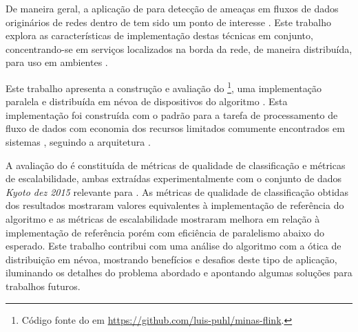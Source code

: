 De maneira geral, a aplicação de \nd para detecção de ameaças em fluxos de dados
originários de redes \iot dentro de \nids tem sido um ponto de interesse
\cite{Viegas2019,Lopez2019,DaCosta2019a}.
Este trabalho explora as características de implementação destas técnicas
em conjunto, concentrando-se em serviços localizados na borda da rede, de maneira
distribuída, para uso em ambientes \iot.



Este trabalho apresenta a construção e avaliação do \mfog\footnote{
    Código fonte do \mfog em \url{https://github.com/luis-puhl/minas-flink}.
}, uma implementação
paralela e distribuída em névoa de dispositivos \iot do algoritmo \minas.
Esta implementação foi construída com o padrão \mpi para a tarefa de
processamento de fluxo de dados com economia dos recursos limitados comumente
encontrados em sistemas \iot, seguindo a arquitetura \arch \cite{Cassales2019}.

A avaliação do \mfog é constituída de métricas de qualidade de classificação e
métricas de escalabilidade,
ambas extraídas experimentalmente com o conjunto de dados
\emph{Kyoto dez 2015} relevante para \nids.
% 
% 
As métricas de qualidade de classificação obtidas dos resultados mostraram
valores equivalentes à implementação de referência do algoritmo \minas e
as métricas de escalabilidade 
mostraram melhora em relação à implementação de
referência porém com eficiência de paralelismo abaixo do esperado.
Este trabalho contribui com uma análise do algoritmo \minas com a ótica de
distribuição em névoa, mostrando benefícios e desafios deste tipo de aplicação,
iluminando os detalhes do problema abordado e apontando algumas soluções para
trabalhos futuros.

